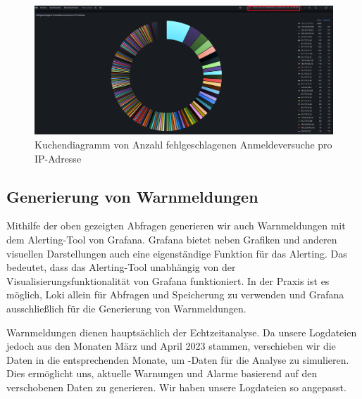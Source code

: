 \newpage
{}
\thispagestyle{lscape}
\begin{landscape}
    \begin{figure}[H]
        \centerline{\includegraphics[width=1.6\textwidth]{assets/Failed_pro_ip2.png}}
        \caption[Kuchendiagramm von Anzahl fehlgeschlagenen Anmeldeversuche pro IP-Adresse]
        {Kuchendiagramm von Anzahl fehlgeschlagenen Anmeldeversuche pro IP-Adresse}
        \label{fig:1_Anmeldung_IPAdresseOhne194}
        \centering
    \end{figure}
\end{landscape}
\restoregeometry




\subsection{Generierung von Warnmeldungen}

Mithilfe der oben gezeigten Abfragen generieren wir auch Warnmeldungen mit dem Alerting-Tool von Grafana. Grafana bietet neben Grafiken und anderen visuellen Darstellungen auch eine eigenständige Funktion für das Alerting. Das bedeutet, dass das Alerting-Tool unabhängig von der Visualisierungsfunktionalität von Grafana funktioniert. In der Praxis ist es möglich, Loki allein für Abfragen und Speicherung zu verwenden und Grafana ausschließlich für die Generierung von Warnmeldungen.

Warnmeldungen dienen hauptsächlich der Echtzeitanalyse. Da unsere Logdateien jedoch aus den Monaten März und April 2023 stammen, verschieben wir die Daten in die entsprechenden Monate, um -Daten für die Analyse zu simulieren. Dies ermöglicht uns, aktuelle Warnungen und Alarme basierend auf den verschobenen Daten zu generieren. Wir haben unsere Logdateien so angepasst.


